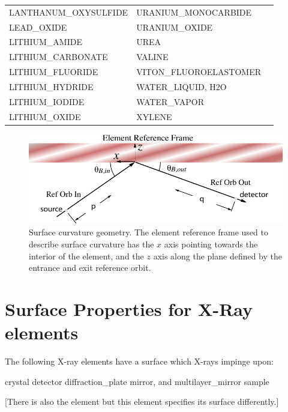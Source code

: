 \begin{center}
\begin{longtable}{lll}
LANTHANUM_OXYSULFIDE                & URANIUM_MONOCARBIDE                       \\
LEAD_OXIDE                          & URANIUM_OXIDE                             \\
LITHIUM_AMIDE                       & UREA                                      \\
LITHIUM_CARBONATE                   & VALINE                                    \\
LITHIUM_FLUORIDE                    & VITON_FLUOROELASTOMER                     \\
LITHIUM_HYDRIDE                     & WATER_LIQUID, H2O                         \\
LITHIUM_IODIDE                      & WATER_VAPOR                               \\
LITHIUM_OXIDE                       & XYLENE                                    \\
\end{longtable}
\end{center}


\begin{figure}[tb]
  \centering
  \includegraphics[width=5in]{surface-curvature.pdf}
  \caption[Surface curvature geometry.]
{Surface curvature geometry. The element reference frame used to
describe surface curvature has the $x$ axis pointing towards the
interior of the element, and the $z$ axis along the plane defined by
the entrance and exit reference orbit.}
  \label{f:surface}
\end{figure}

\section{Surface Properties for X-Ray elements}
\label{s:s.curve}

The following X-ray elements have a surface which X-rays impinge upon:
\begin{example}
  crystal               
  detector              
  diffraction_plate     
  mirror, and           
  multilayer_mirror     
  sample                
\end{example}
[There is also the  element but this element specifies
its surface differently.]

